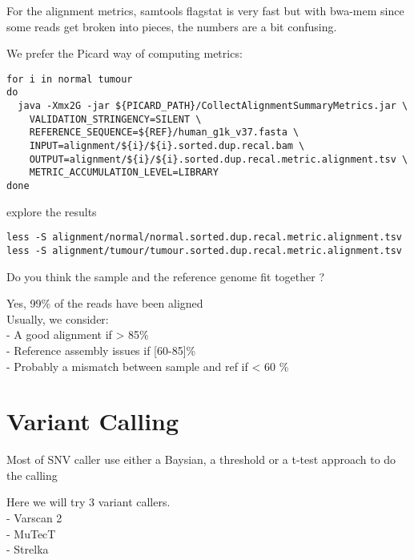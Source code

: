 For the alignment metrics, samtools flagstat is very fast but with bwa-mem since some reads get broken into pieces, the numbers are a bit confusing. 

We prefer the Picard way of computing metrics:
\begin{lstlisting}
for i in normal tumour
do
  java -Xmx2G -jar ${PICARD_PATH}/CollectAlignmentSummaryMetrics.jar \
    VALIDATION_STRINGENCY=SILENT \
    REFERENCE_SEQUENCE=${REF}/human_g1k_v37.fasta \
    INPUT=alignment/${i}/${i}.sorted.dup.recal.bam \
    OUTPUT=alignment/${i}/${i}.sorted.dup.recal.metric.alignment.tsv \
    METRIC_ACCUMULATION_LEVEL=LIBRARY
done
\end{lstlisting}

explore the results

\begin{lstlisting}
less -S alignment/normal/normal.sorted.dup.recal.metric.alignment.tsv
less -S alignment/tumour/tumour.sorted.dup.recal.metric.alignment.tsv

\end{lstlisting}

\begin{question}
Do you think the sample and the reference genome fit together ?
\end{question}
\begin{answer}
Yes, 99\% of the reads have been aligned \\
Usually, we consider:  \\
   - A good alignment if > 85\% \\
   - Reference assembly issues if [60-85]\% \\
   - Probably a mismatch between sample and ref if < 60 \%
\end{answer}




\newpage


\section{Variant Calling}

Most of SNV caller use either a Baysian, a threshold or a t-test approach to do the calling

 Here we will try 3 variant callers.\\
- Varscan 2 \\
- MuTecT \\
- Strelka

